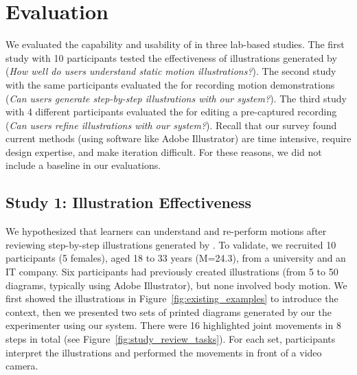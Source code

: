 
\section{Evaluation}
We evaluated the capability and usability of \systemname{} in three lab-based studies.
%
The first study with 10 participants tested the effectiveness of illustrations generated by \systemname{} (\emph{How well do users understand static motion illustrations?}).
%
The second study with the same participants evaluated the \phaseI{} for recording motion demonstrations (\emph{Can users generate step-by-step illustrations with our system?}).
%
The third study with 4 different participants evaluated the \phaseII{} for editing a pre-captured recording (\emph{Can users refine illustrations with our system?}).
%
Recall that our survey found current methods (using software like Adobe Illustrator) are time intensive, require design expertise, and make iteration difficult.
For these reasons, we did not include a baseline in our evaluations.


\subsection{Study 1: Illustration Effectiveness}

We hypothesized that learners can understand and re-perform motions after reviewing step-by-step illustrations generated by \systemname{}.
To validate, we recruited 10 participants (5 females), aged 18 to 33 years (M=24.3), from a university and an IT company.
%
Six participants had previously created illustrations (from 5 to 50 diagrams, typically using Adobe Illustrator), but none involved body motion. %
%
%
%
We first showed the illustrations in Figure~\ref{fig:existing_examples} to introduce the context,
%
then we presented two sets of printed diagrams generated by our the experimenter using our system. There were 16 highlighted joint movements in 8 steps in total (see Figure~\ref{fig:study_review_tasks}).
For each set, participants interpret the illustrations and performed the movements in front of a video camera. %
%

